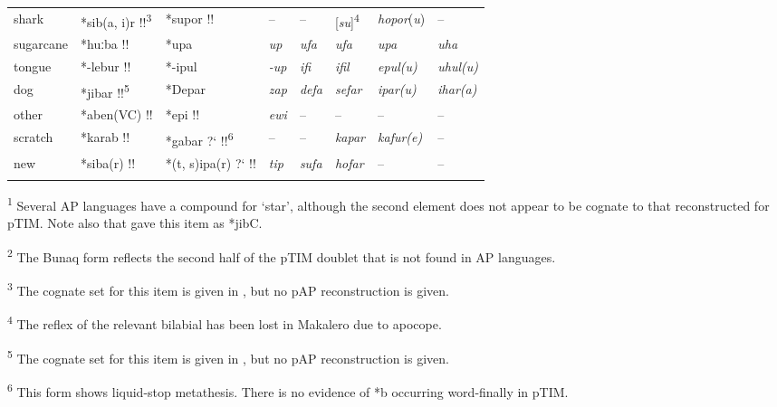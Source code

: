 \begin{sidewaystable}
\begin{tabular*}{\textwidth}{llllllll}
shark & *sib(a, i)r !!\textsuperscript{3} & *supor !! & -- & -- & [\textit{su}]\textsuperscript{4} &   \textit{hopor}(\textit{u}) & --\\
sugarcane & *huːba !! & *upa &{\itshape  up} &{\itshape  ufa} &{\itshape  ufa} &{\itshape  upa} &{\itshape  uha}\\
tongue & *-lebur !! & *-ipul &{\itshape  {}-up} &{\itshape  ifi} &{\itshape  ifil} &{\itshape  epul(u)} &{\itshape  uhul(u)}\\
dog & *jibar !!\textsuperscript{5} & *Depar &{\itshape  zap} &{\itshape  defa} &{\itshape  sefar} &{\itshape  ipar(u)} &{\itshape  ihar(a)}\\
other & *aben(VC) !! & *epi !! &{\itshape  ewi} & -- & -- & -- & --\\
scratch & *karab !! & *gabar ?` !!\textsuperscript{6} & -- & -- &{\itshape  kapar} &{\itshape  kafur(e)} & --\\
new & *siba(r) !! & *(t, s)ipa(r) ?` !! &{\itshape  tip} & {\itshape sufa} & {\itshape hofar} & -- & --\\
\mybottomrule
\end{tabular*}

 
\raggedright
\textsuperscript{1} Several AP languages have a compound for `star', although the second element does not appear to be cognate to that reconstructed for pTIM. Note also that \citet{HoltonEtAl2012} gave this item as *jibC.

\textsuperscript{2} The Bunaq form reflects the second half of the pTIM doublet that is not found in AP languages.

\textsuperscript{3} The cognate set for this item is given in \citet{HoltonEtAl2012}, but no pAP reconstruction is given.

\textsuperscript{4} The reflex of the relevant bilabial has been lost in Makalero due to apocope.

\textsuperscript{5} The cognate set for this item is given in \citet{HoltonEtAl2012}, but no pAP reconstruction is given.

\textsuperscript{6} This form shows liquid-stop metathesis. There is no evidence of *b occurring word-finally in pTIM.
\end{sidewaystable}




